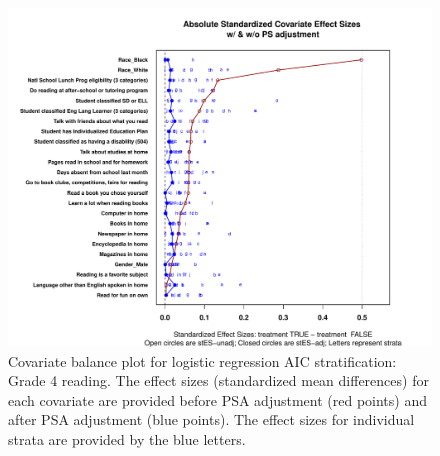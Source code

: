 \begin{figure}
\begin{center}
\includegraphics[width=\textwidth]{../Figures2009/g4read-lrAIC-balance.pdf}
\caption[Covariate balance plot for logistic regression AIC stratification: Grade 4 reading]{Covariate balance plot for logistic regression AIC stratification: Grade 4 reading. The effect sizes (standardized mean differences) for each covariate are provided before PSA adjustment (red points) and after PSA adjustment (blue points). The effect sizes for individual strata are provided by the blue letters.}
\end{center}
\end{figure}


